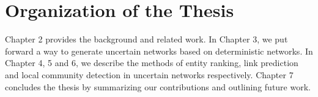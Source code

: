 \documentclass[\main/thesis.tex]{subfiles}
\begin{document}
\section{Organization of the Thesis}

Chapter 2 provides the background and related work. In Chapter 3, we put forward a way to generate uncertain networks based on deterministic networks. In Chapter 4, 5 and 6, we describe the methods of entity ranking, link prediction and local community detection in uncertain networks respectively. Chapter 7 concludes the thesis by summarizing our contributions and outlining future work.







\end{document}
